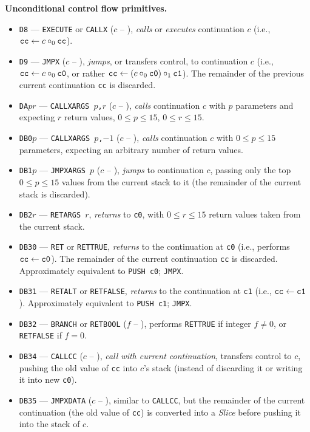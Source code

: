 \documentclass[12pt,oneside]{article}
\def\makepoint#1{\medbreak\noindent{\bf #1.\ }}
\def\nxsubpoint{\refstepcounter{subsubsection}%
  \smallbreak\makepoint{\thesubsubsection}}
\def\emb#1{\textbf{#1.}}
\begin{document}
\nxsubpoint\emb{Unconditional control flow primitives}
\begin{itemize}
\item {\tt D8} --- {\tt EXECUTE} or {\tt CALLX} ($c$ -- ), {\em calls\/} or {\em executes\/} continuation $c$ (i.e., ${\tt cc}\leftarrow c\circ_0{\tt cc}$).
\item {\tt D9} --- {\tt JMPX} ($c$ -- ), {\em jumps\/}, or transfers control, to continuation $c$ (i.e., ${\tt cc}\leftarrow c\circ_0{\tt c0}$, or rather ${\tt cc}\leftarrow(c\circ_0{\tt c0})\circ_1{\tt c1}$). The remainder of the previous current continuation {\tt cc} is discarded.
\item {\tt DA$pr$} --- {\tt CALLXARGS $p$,$r$} ($c$ -- ), {\em calls\/} continuation $c$ with $p$ parameters and expecting $r$ return values, $0\leq p\leq15$, $0\leq r\leq 15$.
\item {\tt DB0$p$} --- {\tt CALLXARGS $p$,$-1$} ($c$ -- ), {\em calls\/} continuation $c$ with $0\leq p\leq15$ parameters, expecting an arbitrary number of return values.
\item {\tt DB1$p$} --- {\tt JMPXARGS $p$} ($c$ -- ), {\em jumps\/} to continuation $c$, passing only the top $0\leq p\leq 15$ values from the current stack to it (the remainder of the current stack is discarded).
\item {\tt DB2$r$} --- {\tt RETARGS $r$}, {\em returns} to {\tt c0}, with $0\leq r\leq 15$ return values taken from the current stack.
\item {\tt DB30} --- {\tt RET} or {\tt RETTRUE}, {\em returns} to the continuation at {\tt c0} (i.e., performs ${\tt cc}\leftarrow{\tt c0}$). The remainder of the current continuation {\tt cc} is discarded. Approximately equivalent to {\tt PUSH c0}; {\tt JMPX}.
\item {\tt DB31} --- {\tt RETALT} or {\tt RETFALSE}, {\em returns} to the continuation at {\tt c1} (i.e., ${\tt cc}\leftarrow{\tt c1}$). Approximately equivalent to {\tt PUSH c1}; {\tt JMPX}.
\item {\tt DB32} --- {\tt BRANCH} or {\tt RETBOOL} ($f$ -- ), performs {\tt RETTRUE} if integer $f\neq 0$, or {\tt RETFALSE} if $f=0$.
\item {\tt DB34} --- {\tt CALLCC} ($c$ -- ), {\em call with current continuation}, transfers control to $c$, pushing the old value of {\tt cc} into $c$'s stack (instead of discarding it or writing it into new {\tt c0}).
\item {\tt DB35} --- {\tt JMPXDATA} ($c$ -- ), similar to {\tt CALLCC}, but the remainder of the current continuation (the old value of {\tt cc}) is converted into a {\em Slice\/} before pushing it into the stack of $c$.

\end{itemize}
\end{document}
